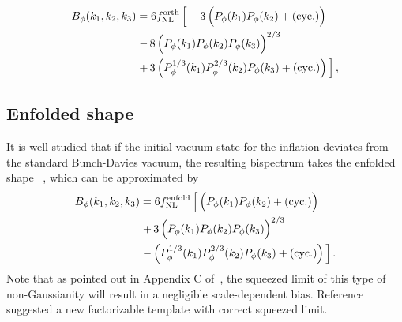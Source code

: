 \documentclass[twocolumn,floatfix,nofootinbib,aps,reprint]{revtex4}
\begin{document}
\begin{equation}
    \begin{split}
        B_\phi(k_1, k_2, k_3) &= 6 f_\mathrm{NL}^\mathrm{orth}
        \left[\vphantom{P^{2/3}}
        -3\left(\vphantom{P^{2/3}}
        P_\phi(k_1)P_\phi(k_2) + (\mathrm{cyc.})\right)
        \right.\\
        &\left. 
        -\,8\left(\vphantom{P^{2/3}}
        P_\phi(k_1)P_\phi(k_2)P_\phi(k_3)\right)^{2/3}
        \vphantom{P^{2/3}}\right. \\
        &\left.
        +\,3\left(P_\phi^{1/3}(k_1)P_\phi^{2/3}(k_2)P_\phi(k_3) + 
        (\mathrm{cyc.}) \right)
        \vphantom{P^{2/3}}\right], \label{eq:B-orth}
    \end{split}
\end{equation}

\subsection{Enfolded shape}
It is well studied that if the initial vacuum state for the inflation 
deviates from the standard Bunch-Davies vacuum, the resulting bispectrum 
takes the enfolded shape
~\cite{2007JCAP...01..002C,2008JCAP...05..001H,
2009JCAP...05..018M,2011JCAP...01..030A},
which can be approximated by
\begin{equation}
    \begin{split}
        B_\phi(k_1, k_2, k_3) &= 6 f_\mathrm{NL}^\mathrm{enfold}
        \left[\vphantom{P^{2/3}}
        \left(\vphantom{P^{2/3}}
        P_\phi(k_1)P_\phi(k_2) + (\mathrm{cyc.})\right)
        \right.\\
        &\left. 
        +\,3\left(\vphantom{P^{2/3}}
        P_\phi(k_1)P_\phi(k_2)P_\phi(k_3)\right)^{2/3}
        \vphantom{P^{2/3}}\right. \\
        &\left.
        -\left(P_\phi^{1/3}(k_1)P_\phi^{2/3}(k_2)P_\phi(k_3) + 
        (\mathrm{cyc.}) \right)
        \vphantom{P^{2/3}}\right]. \label{eq:B-enfold}
    \end{split}
\end{equation}
Note that as pointed out in Appendix C of~\cite{Creminelli11}, the squeezed limit of this type of non-Gaussianity will result in a negligible scale-dependent bias. Reference~\cite{Creminelli11} suggested a new factorizable template with correct squeezed limit.
\end{document}
